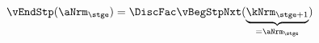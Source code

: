   \begin{equation}\begin{gathered}\begin{aligned}
\vEndStp(\aNrm_{\stge}) & = \DiscFac \vBegStpNxt(\underbrace{\kNrm_{\stge+1}}_{=\aNrm_{\stge}}) \label{eq:vEndStp}
      \end{aligned}\end{gathered}\end{equation}
